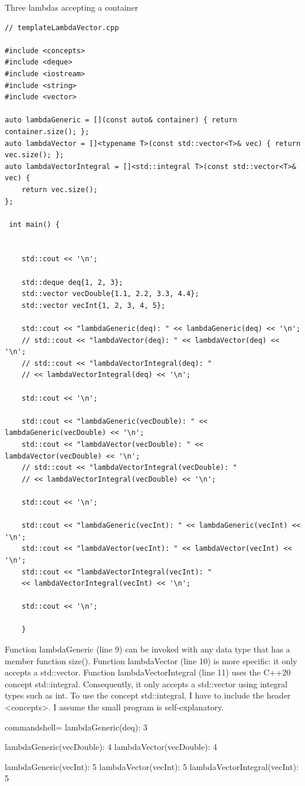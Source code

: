 \noindent
Three lambdas accepting a container
\begin{lstlisting}[style=styleCXX]
// templateLambdaVector.cpp

#include <concepts>
#include <deque>
#include <iostream>
#include <string>
#include <vector>

auto lambdaGeneric = [](const auto& container) { return container.size(); };
auto lambdaVector = []<typename T>(const std::vector<T>& vec) { return vec.size(); };
auto lambdaVectorIntegral = []<std::integral T>(const std::vector<T>& vec) {
	return vec.size();
};

 int main() {
	
	
	std::cout << '\n';
	
	std::deque deq{1, 2, 3};
	std::vector vecDouble{1.1, 2.2, 3.3, 4.4};
	std::vector vecInt{1, 2, 3, 4, 5};
	
	std::cout << "lambdaGeneric(deq): " << lambdaGeneric(deq) << '\n';
	// std::cout << "lambdaVector(deq): " << lambdaVector(deq) << '\n';
	// std::cout << "lambdaVectorIntegral(deq): "
	// << lambdaVectorIntegral(deq) << '\n';
	
	std::cout << '\n';
	
	std::cout << "lambdaGeneric(vecDouble): " << lambdaGeneric(vecDouble) << '\n';
	std::cout << "lambdaVector(vecDouble): " << lambdaVector(vecDouble) << '\n';
	// std::cout << "lambdaVectorIntegral(vecDouble): "
	// << lambdaVectorIntegral(vecDouble) << '\n';
	
	std::cout << '\n';
	
	std::cout << "lambdaGeneric(vecInt): " << lambdaGeneric(vecInt) << '\n';
	std::cout << "lambdaVector(vecInt): " << lambdaVector(vecInt) << '\n';
	std::cout << "lambdaVectorIntegral(vecInt): "
	<< lambdaVectorIntegral(vecInt) << '\n';
	
	std::cout << '\n';
	
	}
\end{lstlisting}

Function lambdaGeneric (line 9) can be invoked with any data type that has a member function size(). Function lambdaVector (line 10) is more specific: it only accepts a std::vector. Function lambdaVectorIntegral (line 11) uses the C++20 concept std::integral. Consequently, it only accepts a std::vector using integral types such as int. To use the concept std::integral, I have to include the header <concepts>. I assume the small program is self-explanatory.

\begin{tcblisting}{commandshell={}}
lambdaGeneric(deq): 3

lambdaGeneric(vecDouble): 4
lambdaVector(vecDouble): 4

lambdaGeneric(vecInt): 5
lambdaVector(vecInt): 5
lambdaVectorIntegral(vecInt): 5
\end{tcblisting}

